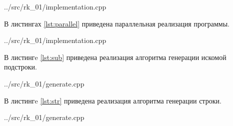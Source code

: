 \begin{lstinputlisting}[
	label={lst:linear},
	caption={Последовательная реализация},
	firstline=14,
	lastline=23
	]{../src/rk_01/implementation.cpp}
\end{lstinputlisting}

\newpage
В листингах \ref{lst:parallel} приведена параллельная реализация программы.

\begin{lstinputlisting}[
	label={lst:parallel},
	caption={Параллельная реализация},
	firstline=25
	]{../src/rk_01/implementation.cpp}
\end{lstinputlisting}

В листингe \ref{lst:sub} приведена реализация алгоритма генерации искомой подстроки.

\begin{lstinputlisting}[
	label={lst:sub},
	caption={Генерация подстроки},
	firstline=7,
	lastline=14
	]{../src/rk_01/generate.cpp}
\end{lstinputlisting}

\newpage
В листингe \ref{lst:str} приведена реализация алгоритма генерации строки.

\begin{lstinputlisting}[
	label={lst:str},
	caption={Генерация строки},
	firstline=16,
	lastline=36
	]{../src/rk_01/generate.cpp}
\end{lstinputlisting}